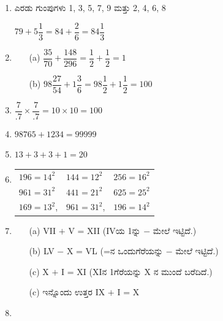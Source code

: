 \begin{enumerate}
\itemsep=5pt

\item ಎರಡು ಗುಂಪುಗಳು 1, 3, 5, 7, 9 ಮತ್ತು 2, 4, 6, 8

$79 + 5\dfrac{1}{3} = 84 + \dfrac{2}{6} = 84\dfrac{1}{3}$

\item 
\begin{itemize}
\item[(a)] $\dfrac{35}{70} + \dfrac{148}{296} = \dfrac{1}{2} + \dfrac{1}{2} = 1$

\medskip

\item[(b)] $98 \dfrac{27}{54} + 1\dfrac{3}{6} = 98\dfrac{1}{2} + 1\dfrac{1}{2} = 100$
\end{itemize}

\item $\dfrac{7}{.7}\times \dfrac{7}{.7} = 10\times 10 = 100$

\smallskip
\item $98765 + 1234 = 99999$

\item $13 + 3 + 3 + 1 = 20$

\item 

\begin{tabular}[t]{lll}
$196 = 14^{2}$ & $144 = 12^{2}$ & $256 = 16^{2}$\\
$961 = 31^{2}$ & $441 = 21^{2}$ & $625 = 25^{2}$\\
$169 = 13^{2}$, & $961 = 31^{2}$, & $196 = 14^{2}$
\end{tabular}

\item 
\begin{itemize}
\item[(a)] VII $+$ V = XII (IVಯ 1ನ್ನು $-$ ಮೇಲೆ ಇಟ್ಟಿದೆ.)
\item[(b)] LV $-$ X = VL (=ನ ಒಂದುಗೆರೆಯನ್ನು $-$ ಮೇಲೆ ಇಟ್ಟಿದೆ.)
\item[(c)] X $+$ I = XI (XIನ 1ಗೆರೆಯನ್ನು X ನ ಮುಂದೆ ಬರೆದಿದೆ.)
\item[(c)] ಇನ್ನೊಂದು ಉತ್ತರ IX $+$ I = X
\end{itemize}

\item 
~


\end{enumerate}
